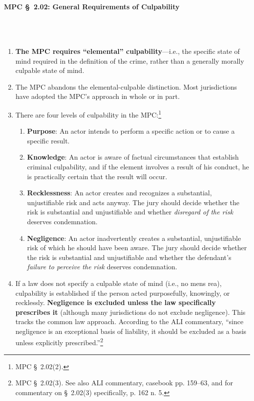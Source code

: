 \paragraph{MPC \S\ 2.02: General Requirements of Culpability}
~\\\\
\begin{enumerate}
    \item \textbf{The MPC requires ``elemental'' culpability}---i.e., the 
    specific state of mind required in the definition of the crime, rather 
    than a generally morally culpable state of mind.
    \item The MPC abandons the elemental-culpable distinction. Most 
    jurisdictions have adopted the MPC's approach in whole or in part.
    \item There are four levels of culpability in the MPC:\footnote{MPC \S\ 
    2.02(2).}
    \begin{enumerate}
        \item \textbf{Purpose}: An actor intends to perform a specific action 
        or to cause a specific result.
        \item \textbf{Knowledge}: An actor is aware of factual circumstances 
        that establish criminal culpability, and if the element involves a 
        result of his conduct, he is practically certain that the result will 
        occur.
        \item \textbf{Recklessness}: An actor creates and recognizes a 
        substantial, unjustifiable risk and acts anyway. The jury should 
        decide whether the risk is substantial and unjustifiable and whether 
        \emph{disregard of the risk} deserves condemnation.
        \item \textbf{Negligence}: An actor inadvertently creates a 
        substantial, unjustifiable risk of which he should have been aware. 
        The jury should decide whether the risk is substantial and 
        unjustifiable and whether the defendant's \emph{failure to perceive 
        the risk} deserves condemnation.
    \end{enumerate}
    \item If a law does not specify a culpable state of mind (i.e., no mens 
    rea), culpability is established if the person acted purposefully, 
    knowingly, or recklessly. \textbf{Negligence is excluded unless the law 
    specifically prescribes it} (although many jurisdictions do not exclude 
    negligence). This tracks the common law approach. According to the ALI 
    commentary, ``since negligence is an exceptional basis of liability, it 
    should be excluded as a basis unless explicitly prescribed.''\footnote{MPC 
    \S\ 2.02(3). See also ALI commentary, casebook pp. 159--63, and for 
    commentary on \S\ 2.02(3) specifically, p. 162 n. 5.}
\end{enumerate}

